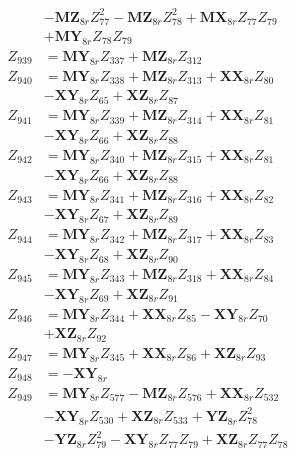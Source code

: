 \begin{multicols}{2}
\begin{align}
&- \mathbf{MZ}_{8r}Z_{77}^2 - \mathbf{MZ}_{8r}Z_{78}^2 + \mathbf{MX}_{8r}Z_{77}Z_{79}  \nonumber \\
&+ \mathbf{MY}_{8r}Z_{78}Z_{79} \nonumber \\
Z_{939} &= \mathbf{MY}_{8r}Z_{337} + \mathbf{MZ}_{8r}Z_{312} \nonumber \\
Z_{940} &= \mathbf{MY}_{8r}Z_{338} + \mathbf{MZ}_{8r}Z_{313} + \mathbf{XX}_{8r}Z_{80}  \nonumber \\
&- \mathbf{XY}_{8r}Z_{65} + \mathbf{XZ}_{8r}Z_{87} \nonumber \\
Z_{941} &= \mathbf{MY}_{8r}Z_{339} + \mathbf{MZ}_{8r}Z_{314} + \mathbf{XX}_{8r}Z_{81}  \nonumber \\
&- \mathbf{XY}_{8r}Z_{66} + \mathbf{XZ}_{8r}Z_{88} \nonumber \\
Z_{942} &= \mathbf{MY}_{8r}Z_{340} + \mathbf{MZ}_{8r}Z_{315} + \mathbf{XX}_{8r}Z_{81}  \nonumber \\
&- \mathbf{XY}_{8r}Z_{66} + \mathbf{XZ}_{8r}Z_{88} \nonumber \\
Z_{943} &= \mathbf{MY}_{8r}Z_{341} + \mathbf{MZ}_{8r}Z_{316} + \mathbf{XX}_{8r}Z_{82}  \nonumber \\
&- \mathbf{XY}_{8r}Z_{67} + \mathbf{XZ}_{8r}Z_{89} \nonumber \\
Z_{944} &= \mathbf{MY}_{8r}Z_{342} + \mathbf{MZ}_{8r}Z_{317} + \mathbf{XX}_{8r}Z_{83}  \nonumber \\
&- \mathbf{XY}_{8r}Z_{68} + \mathbf{XZ}_{8r}Z_{90} \nonumber \\
Z_{945} &= \mathbf{MY}_{8r}Z_{343} + \mathbf{MZ}_{8r}Z_{318} + \mathbf{XX}_{8r}Z_{84}  \nonumber \\
&- \mathbf{XY}_{8r}Z_{69} + \mathbf{XZ}_{8r}Z_{91} \nonumber \\
Z_{946} &= \mathbf{MY}_{8r}Z_{344} + \mathbf{XX}_{8r}Z_{85} - \mathbf{XY}_{8r}Z_{70}  \nonumber \\
&+ \mathbf{XZ}_{8r}Z_{92} \nonumber \\
Z_{947} &= \mathbf{MY}_{8r}Z_{345} + \mathbf{XX}_{8r}Z_{86} + \mathbf{XZ}_{8r}Z_{93} \nonumber \\
Z_{948} &= -\mathbf{XY}_{8r} \nonumber \\
Z_{949} &= \mathbf{MY}_{8r}Z_{577} - \mathbf{MZ}_{8r}Z_{576} + \mathbf{XX}_{8r}Z_{532}  \nonumber \\
&- \mathbf{XY}_{8r}Z_{530} + \mathbf{XZ}_{8r}Z_{533} + \mathbf{YZ}_{8r}Z_{78}^2  \nonumber \\
&- \mathbf{YZ}_{8r}Z_{79}^2 - \mathbf{XY}_{8r}Z_{77}Z_{79} + \mathbf{XZ}_{8r}Z_{77}Z_{78}  \nonumber \\

\end{align}
\end{multicols}
